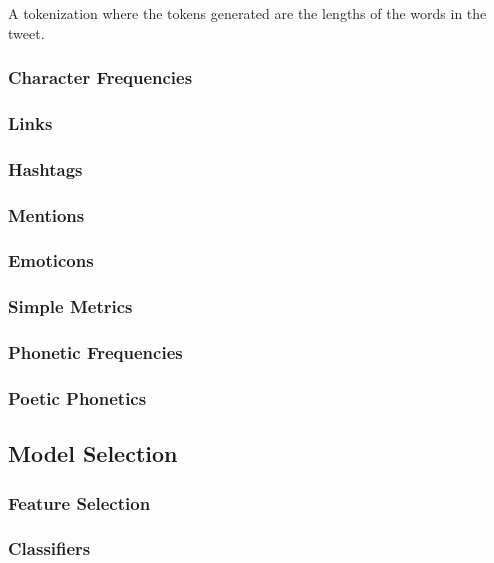 \documentclass[11pt]{article}
\begin{document}
A tokenization where the tokens generated are the lengths of the words in the tweet.

\subsubsection{Character Frequencies}

\subsubsection{Links}

\subsubsection{Hashtags}

\subsubsection{Mentions}

\subsubsection{Emoticons}

\subsubsection{Simple Metrics}

\subsubsection{Phonetic Frequencies}

\subsubsection{Poetic Phonetics}

\subsection{Model Selection}

\subsubsection{Feature Selection}

\subsubsection{Classifiers}
\end{document}
